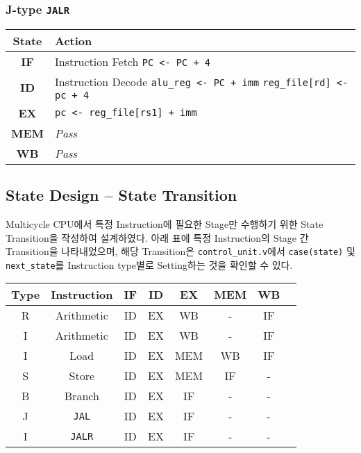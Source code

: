 \documentclass{scrartcl}
\begin{document}
\subsubsection{J-type \texttt{JALR}}
\begin{tabularx}{\textwidth}{ | c | X | }
  \hline
  \textbf{State} & \textbf{Action} \\ \hline
  \textbf{IF} & Instruction Fetch \newline \texttt{PC <- PC + 4} \\ \hline
  \textbf{ID} & Instruction Decode \newline \texttt{alu\_reg <- PC + imm} \newline \texttt{reg\_file[rd] <- pc + 4} \\ \hline
  \textbf{EX} & \texttt{pc <- reg\_file[rs1] + imm} \\ \hline
  \textbf{MEM} & \textit{Pass} \\ \hline
  \textbf{WB} & \textit{Pass} \\
  \hline
\end{tabularx}

\subsection{State Design -- State Transition}
Multicycle CPU에서 특정 Instruction에 필요한 Stage만 수행하기 위한 State Transition을 작성하여 설계하였다.
아래 표에 특정 Instruction의 Stage 간 Transition을 나타내었으며, 해당 Transition은 \texttt{control\_unit.v}에서
\texttt{case(state)} 및 \texttt{next\_state}를 Instruction type별로 Setting하는 것을 확인할 수 있다.
\begin{center}
  \begin{tabular}{ | c | c | c | c | c | c | c | c |}
    \hline
    \textbf{Type} & \textbf{Instruction} & \textbf{IF} & \textbf{ID} & \textbf{EX} & \textbf{MEM} & \textbf{WB} \\ \hline
    R & Arithmetic & ID & EX & WB & - & IF \\ \hline
    I & Arithmetic & ID & EX & WB & - & IF \\ \hline
    I & Load & ID & EX & MEM & WB & IF \\ \hline
    S & Store & ID & EX & MEM & IF & - \\ \hline
    B & Branch & ID & EX & IF & - & - \\ \hline
    J & \texttt{JAL} & ID & EX & IF & - & - \\ \hline
    I & \texttt{JALR} & ID & EX & IF & - & - \\ \hline
  \end{tabular}
\end{center}
\end{document}
